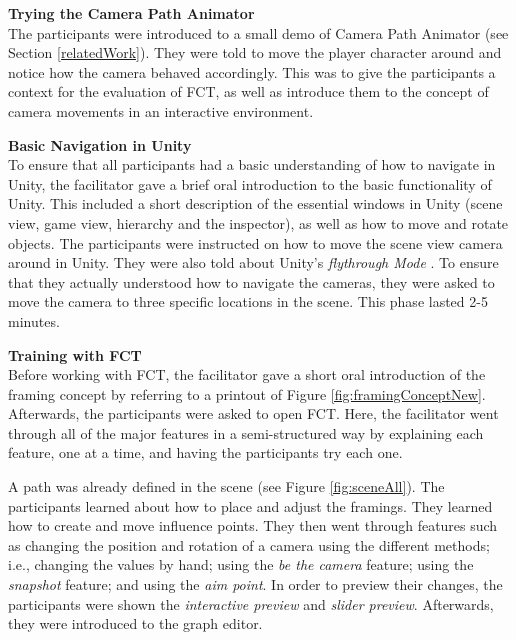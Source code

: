 \textbf{Trying the Camera Path Animator}\\
The participants were introduced to a small demo of Camera Path Animator \cite{unity_camTool} (see Section \ref{relatedWork}). They were told to move the player character around and notice how the camera behaved accordingly. This was to give the participants a context for the evaluation of FCT, as well as introduce them to the concept of camera movements in an interactive environment.




\textbf{Basic Navigation in Unity}\\
To ensure that all participants had a basic understanding of how to navigate in Unity, the facilitator gave a brief oral introduction to the basic functionality of Unity. This included a short description of the essential windows in Unity (scene view, game view, hierarchy and the inspector), as well as how to move and rotate objects. The participants were instructed on how to move the scene view camera around in Unity. They were also told about Unity's \textit{flythrough Mode} \cite{unity_flyMode}. To ensure that they actually understood how to navigate the cameras, they were asked to move the camera to three specific locations in the scene. This phase lasted  2-5 minutes.


\textbf{Training with FCT}\\
Before working with FCT, the facilitator gave a short oral introduction of the framing concept by referring to a printout of Figure \ref{fig:framingConceptNew}. Afterwards, the participants were asked to open FCT. Here, the facilitator went through all of the major features in a semi-structured way by explaining each feature, one at a time, and having the participants try each one.

A path was already defined in the scene (see Figure \ref{fig:sceneAll}). The participants learned about how to place and adjust the framings. They learned how to create and move influence points. They then went through features such as changing the position and rotation of a camera using the different methods; i.e., changing the values by hand; using the \textit{be the camera} feature; using the \textit{snapshot} feature; and using the \textit{aim point}. In order to preview their changes, the participants were shown the \textit{interactive preview} and \textit{slider preview}. Afterwards, they were introduced to the graph editor.

